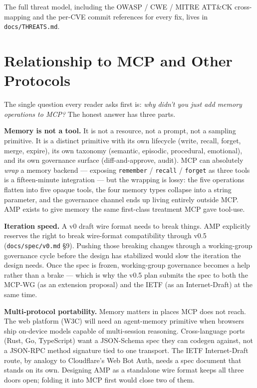\documentclass[11pt,letterpaper,twocolumn]{article}
\begin{document}
The full threat model, including the OWASP / CWE / MITRE ATT\&CK cross-mapping and the per-CVE commit references for every fix, lives in \texttt{docs/THREATS.md}.

\section{Relationship to MCP and Other Protocols}
\label{sec:mcp}

The single question every reader asks first is: \emph{why didn't you just add memory operations to MCP?} The honest answer has three parts.

\textbf{Memory is not a tool.} It is not a resource, not a prompt, not a sampling primitive. It is a distinct primitive with its own lifecycle (write, recall, forget, merge, expire), its own taxonomy (semantic, episodic, procedural, emotional), and its own governance surface (diff-and-approve, audit). MCP can absolutely \emph{wrap} a memory backend --- exposing \texttt{remember} / \texttt{recall} / \texttt{forget} as three tools is a fifteen-minute integration --- but the wrapping is lossy: the five operations flatten into five opaque tools, the four memory types collapse into a string parameter, and the governance channel ends up living entirely outside MCP. AMP exists to give memory the same first-class treatment MCP gave tool-use.

\textbf{Iteration speed.} A v0 draft wire format needs to break things. AMP explicitly reserves the right to break wire-format compatibility through v0.5 (\texttt{docs/spec/v0.md} \S9). Pushing those breaking changes through a working-group governance cycle before the design has stabilized would slow the iteration the design needs. Once the spec is frozen, working-group governance becomes a help rather than a brake --- which is why the v0.5 plan submits the spec to both the MCP-WG (as an extension proposal) and the IETF (as an Internet-Draft) at the same time.

\textbf{Multi-protocol portability.} Memory matters in places MCP does not reach. The web platform (W3C) will need an agent-memory primitive when browsers ship on-device models capable of multi-session reasoning. Cross-language ports (Rust, Go, TypeScript) want a JSON-Schema spec they can codegen against, not a JSON-RPC method signature tied to one transport. The IETF Internet-Draft route, by analogy to Cloudflare's Web Bot Auth, needs a spec document that stands on its own. Designing AMP as a standalone wire format keeps all three doors open; folding it into MCP first would close two of them.
\end{document}
